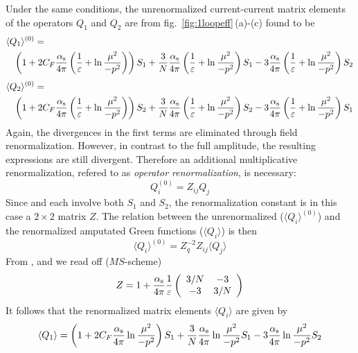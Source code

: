 Under the same conditions, the unrenormalized current-current matrix elements
of the operators $Q_1$ and $Q_2$ are from fig.~\ref{fig:1loopeff}\,(a)-(c)
found to be
\begin{eqnarray}\label{q10}
\lefteqn{\langle Q_1\rangle^{(0)}=} & & \\
& & \left(1+2C_F \aspi\left({1\over\eps}+\ln{\mu^2\over -p^2}
\right)\right)S_1+{3\over N}\aspi\left({1\over\eps}+\ln{\mu^2\over -p^2}\right)S_1-
3\aspi\left({1\over\eps}+\ln{\mu^2\over -p^2}\right) S_2  \nonumber
\end{eqnarray}
\begin{eqnarray}\label{q20}
\lefteqn{\langle Q_2\rangle^{(0)}=} & & \\
& & \left(1+2C_F \aspi\left({1\over\eps}+\ln{\mu^2\over -p^2}
\right)\right)S_2+{3\over N}\aspi\left({1\over\eps}+\ln{\mu^2\over -p^2}\right)S_2-
3\aspi\left({1\over\eps}+\ln{\mu^2\over -p^2}\right) S_1  \nonumber
\end{eqnarray}
Again, the divergences in the first terms are eliminated through field
renormalization. However, in contrast to the full amplitude, the
resulting expressions are still divergent. Therefore an additional
multiplicative renormalization, refered to as {\em operator renormalization},
is necessary:
\begin{equation}
Q_i^{(0)} = Z_{ij} Q_j
\label{AL}
\end{equation}
Since  and  each involve both $S_1$ and
$S_2$, the renormalization constant is in this case a $2\times 2$
matrix $Z$. The relation between the unrenormalized
($\langle Q_i\rangle^{(0)}$) and the renormalized amputated Green
functions ($\langle Q_i\rangle$) is then
\begin{equation}\label{q0zq}
\langle Q_i\rangle^{(0)}=Z^{-2}_q Z_{ij}\langle Q_j\rangle
\end{equation}
From ,  and  we read off ($MS$-scheme)
\begin{equation}\label{zll} Z = 1+ \frac{\alpha_{\rm s}}{4 \pi} {1\over\varepsilon}
 \left(\begin{array}{cc}  3/N & -3 \\
                          -3 & 3/N
    \end{array}\right)   \end{equation}
It follows that the renormalized matrix elements $\langle Q_i\rangle$
are given by
\begin{equation}\label{q1re}
\langle Q_1\rangle=\left(1+2C_F \frac{\alpha_{\rm s}}{4 \pi}\ln{\mu^2\over -p^2}
\right)S_1+{3\over N}\frac{\alpha_{\rm s}}{4 \pi}\ln{\mu^2\over -p^2}S_1-
3\frac{\alpha_{\rm s}}{4 \pi}\ln{\mu^2\over -p^2} S_2   \end{equation}
